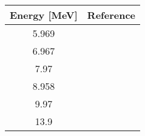 \begin{tabular}{|c||c|} 
    \hline 
    \bf{Energy [MeV]} & \bf{Reference} \\
    \hline
    \hline 
    5.969 & \cite{Roberts91}\\
    6.967 & \cite{Roberts91}\\
    7.97 & \cite{Roberts91}\\
    8.958 & \cite{Roberts91}\\
    9.97 & \cite{Delaroche83}\\
    13.9 & \cite{FloydPhDThesis}\\
    \hline
\end{tabular}
